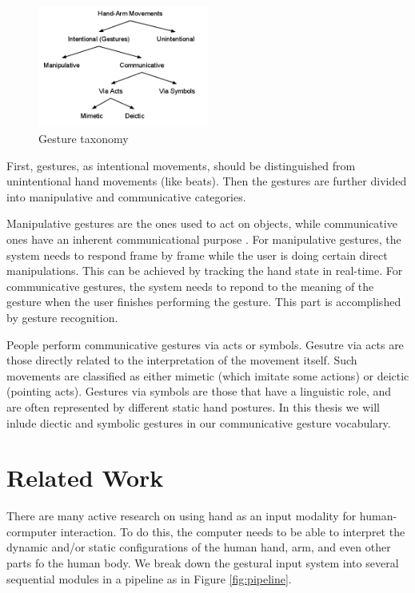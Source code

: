 \begin{figure}[h]
  \centering
  \includegraphics[width=0.5\textwidth]{figures/taxonomy.png} 
  \caption{Gesture taxonomy}
  \label{fig:taxonomy}
\end{figure}

First, gestures, as intentional movements, should be distinguished from
unintentional hand movements (like beats). Then the gestures are further divided
into manipulative and communicative categories. 

Manipulative gestures are the ones used to act on objects, while communicative 
ones have an inherent communicational purpose \cite{Pavlovic97}. For
manipulative gestures, the system needs to respond frame by frame while the user is doing
certain direct manipulations. This can be achieved by tracking the hand
state in real-time. For communicative gestures, the system needs to repond to
the meaning of the gesture when the user finishes performing the gesture. This part is
accomplished by gesture recognition. 

People perform communicative gestures via acts or symbols. Gesutre via acts are
those directly related to the interpretation of the movement itself. Such
movements are classified as either mimetic (which imitate some actions) or deictic (pointing acts). 
Gestures via symbols are those that have a linguistic role, and are
often represented by different static hand postures. In this thesis we will
inlude diectic and symbolic gestures in our communicative gesture vocabulary.

\section{Related Work}
There are many active research on using hand as an input modality for
human-cormputer interaction. To do this, the computer needs to be able to
interpret the dynamic and/or static configurations of the human hand, arm, and
even other parts fo the human body. We break down the gestural input
system into several sequential modules in a pipeline as in Figure
\ref{fig:pipeline}.

